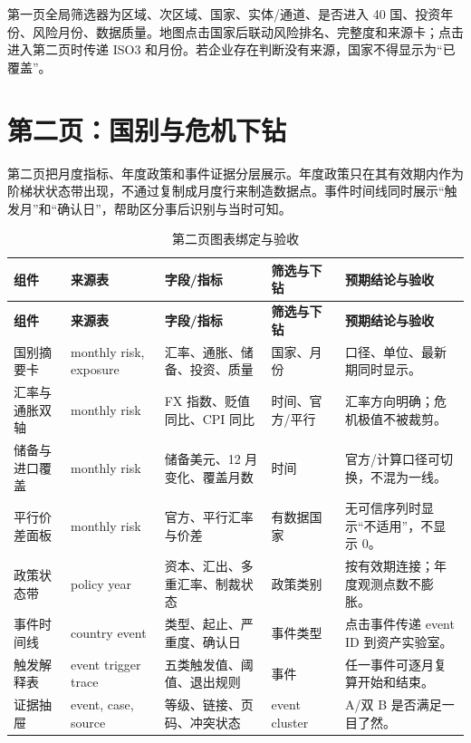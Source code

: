 \documentclass[UTF8,fontset=windows,12pt,openany]{ctexbook}
\begin{document}
第一页全局筛选器为区域、次区域、国家、实体/通道、是否进入 40 国、投资年份、风险月份、数据质量。地图点击国家后联动风险排名、完整度和来源卡；点击进入第二页时传递 ISO3 和月份。若企业存在判断没有来源，国家不得显示为“已覆盖”。

\chapter{第二页：国别与危机下钻}

第二页把月度指标、年度政策和事件证据分层展示。年度政策只在其有效期内作为阶梯状状态带出现，不通过复制成月度行来制造数据点。事件时间线同时展示“触发月”和“确认日”，帮助区分事后识别与当时可知。

\clearpage
\begin{landscape}
\begin{longtable}{p{3.3cm}p{3.5cm}p{4.4cm}p{3.2cm}p{4.5cm}}
\caption{第二页图表绑定与验收}\label{tab:page2-map}\\
\toprule
\textbf{组件} & \textbf{来源表} & \textbf{字段/指标} & \textbf{筛选与下钻} & \textbf{预期结论与验收}\\
\midrule
\endfirsthead
\toprule \textbf{组件} & \textbf{来源表} & \textbf{字段/指标} & \textbf{筛选与下钻} & \textbf{预期结论与验收}\\ \midrule
\endhead
国别摘要卡 & monthly risk, exposure & 汇率、通胀、储备、投资、质量 & 国家、月份 & 口径、单位、最新期同时显示。\\
汇率与通胀双轴 & monthly risk & FX 指数、贬值同比、CPI 同比 & 时间、官方/平行 & 汇率方向明确；危机极值不被裁剪。\\
储备与进口覆盖 & monthly risk & 储备美元、12 月变化、覆盖月数 & 时间 & 官方/计算口径可切换，不混为一线。\\
平行价差面板 & monthly risk & 官方、平行汇率与价差 & 有数据国家 & 无可信序列时显示“不适用”，不显示 0。\\
政策状态带 & policy year & 资本、汇出、多重汇率、制裁状态 & 政策类别 & 按有效期连接；年度观测点数不膨胀。\\
事件时间线 & country event & 类型、起止、严重度、确认日 & 事件类型 & 点击事件传递 event ID 到资产实验室。\\
触发解释表 & event trigger trace & 五类触发值、阈值、退出规则 & 事件 & 任一事件可逐月复算开始和结束。\\
证据抽屉 & event, case, source & 等级、链接、页码、冲突状态 & event cluster & A/双 B 是否满足一目了然。\\
\bottomrule
\end{longtable}
\end{landscape}
\end{document}
